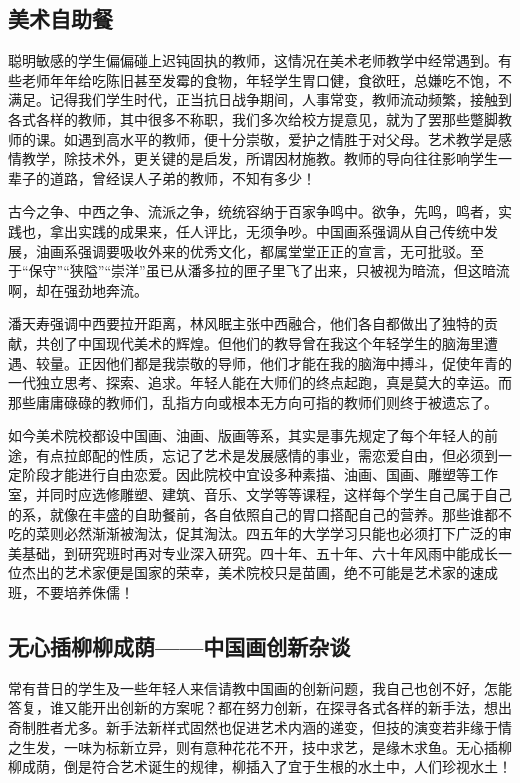 \documentclass{article}
\begin{document}
\subsection{美术自助餐}
聪明敏感的学生偏偏碰上迟钝固执的教师，这情况在美术老师教学中经常遇到。有些老师年年给吃陈旧甚至发霉的食物，年轻学生胃口健，食欲旺，总嫌吃不饱，不满足。记得我们学生时代，正当抗日战争期间，人事常变，教师流动频繁，接触到各式各样的教师，其中很多不称职，我们多次给校方提意见，就为了罢那些蹩脚教师的课。如遇到高水平的教师，便十分崇敬，爱护之情胜于对父母。艺术教学是感情教学，除技术外，更关键的是启发，所谓因材施教。教师的导向往往影响学生一辈子的道路，曾经误人子弟的教师，不知有多少！

古今之争、中西之争、流派之争，统统容纳于百家争鸣中。欲争，先鸣，鸣者，实践也，拿出实践的成果来，任人评比，无须争吵。中国画系强调从自己传统中发展，油画系强调要吸收外来的优秀文化，都属堂堂正正的宣言，无可批驳。至于“保守”“狭隘”“崇洋”虽已从潘多拉的匣子里飞了出来，只被视为暗流，但这暗流啊，却在强劲地奔流。

潘天寿强调中西要拉开距离，林风眠主张中西融合，他们各自都做出了独特的贡献，共创了中国现代美术的辉煌。但他们的教导曾在我这个年轻学生的脑海里遭遇、较量。正因他们都是我崇敬的导师，他们才能在我的脑海中搏斗，促使年青的一代独立思考、探索、追求。年轻人能在大师们的终点起跑，真是莫大的幸运。而那些庸庸碌碌的教师们，乱指方向或根本无方向可指的教师们则终于被遗忘了。

如今美术院校都设中国画、油画、版画等系，其实是事先规定了每个年轻人的前途，有点拉郎配的性质，忘记了艺术是发展感情的事业，需恋爱自由，但必须到一定阶段才能进行自由恋爱。因此院校中宜设多种素描、油画、国画、雕塑等工作室，并同时应选修雕塑、建筑、音乐、文学等等课程，这样每个学生自己属于自己的系，就像在丰盛的自助餐前，各自依照自己的胃口搭配自己的营养。那些谁都不吃的菜则必然渐渐被淘汰，促其淘汰。四五年的大学学习只能也必须打下广泛的审美基础，到研究班时再对专业深入研究。四十年、五十年、六十年风雨中能成长一位杰出的艺术家便是国家的荣幸，美术院校只是苗圃，绝不可能是艺术家的速成班，不要培养侏儒！
\subsection{无心插柳柳成荫——中国画创新杂谈}
常有昔日的学生及一些年轻人来信请教中国画的创新问题，我自己也创不好，怎能答复，谁又能开出创新的方案呢？都在努力创新，在探寻各式各样的新手法，想出奇制胜者尤多。新手法新样式固然也促进艺术内涵的递变，但技的演变若非缘于情之生发，一味为标新立异，则有意种花花不开，技中求艺，是缘木求鱼。无心插柳柳成荫，倒是符合艺术诞生的规律，柳插入了宜于生根的水土中，人们珍视水土！
\end{document}
